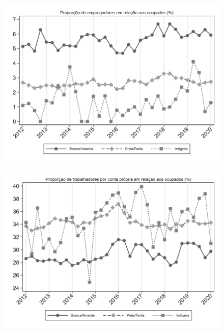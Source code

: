 \begin{frame}[label=_composicao_demografica_raca_prop_empregador]{}
\textit{\hyperlink{_composicao_demografica_raca}{}}
\begin{figure}
  \centering
  \includegraphics[width=1.0\linewidth]{../../analysis/output/composicao_demografica/raca/_composicao_demografica_raca_prop_empregador.png}
  \caption{}
  \label{fig:_composicao_demografica_raca_prop_empregador}
\end{figure}
\end{frame}



\begin{frame}[label=_composicao_demografica_raca_prop_cpropria]{}
\textit{\hyperlink{_composicao_demografica_raca}{}}
\begin{figure}
  \centering
  \includegraphics[width=1.0\linewidth]{../../analysis/output/composicao_demografica/raca/_composicao_demografica_raca_prop_cpropria.png}
  \caption{}
  \label{fig:_composicao_demografica_raca_prop_cpropria}
\end{figure}
\end{frame}

